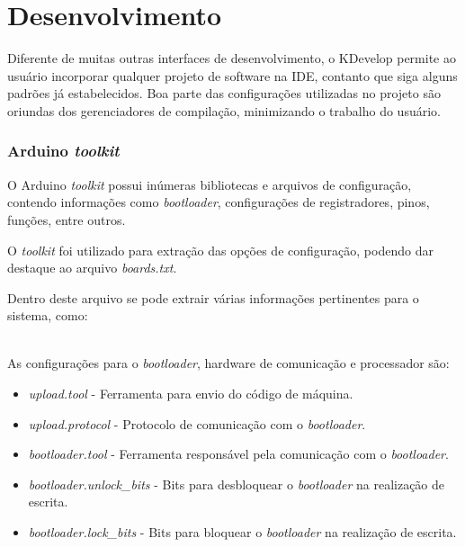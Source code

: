 \chapter{Desenvolvimento}

Diferente de muitas outras interfaces de desenvolvimento, o KDevelop permite ao usuário incorporar qualquer projeto de software na IDE, contanto que siga alguns padrões já estabelecidos. Boa parte das configurações utilizadas no projeto são oriundas dos gerenciadores de compilação, minimizando o trabalho do usuário.

\subsection{Arduino \textit{toolkit}}
O Arduino \textit{toolkit} possui inúmeras bibliotecas e arquivos de configuração, contendo informações como \textit{bootloader}, configurações de registradores, pinos, funções, entre outros.

O \textit{toolkit} foi utilizado para extração das opções de configuração, podendo dar destaque ao arquivo \textit{boards.txt}.



Dentro deste arquivo se pode extrair várias informações pertinentes para o sistema, como:
\\
\\

As configurações para o \textit{bootloader}, hardware de comunicação e processador são:

\begin{itemize}
\item \textit{upload.tool} - Ferramenta para envio do código de máquina.

\item \textit{upload.protocol} - Protocolo de comunicação com o \textit{bootloader}.


\item \textit{bootloader.tool} - Ferramenta responsável pela comunicação com o \textit{bootloader}.

\item \textit{bootloader.unlock\_bits} - Bits para desbloquear o \textit{bootloader} na realização de escrita.

\item \textit{bootloader.lock\_bits} - Bits para bloquear o \textit{bootloader} na realização de escrita.

\end{itemize}

